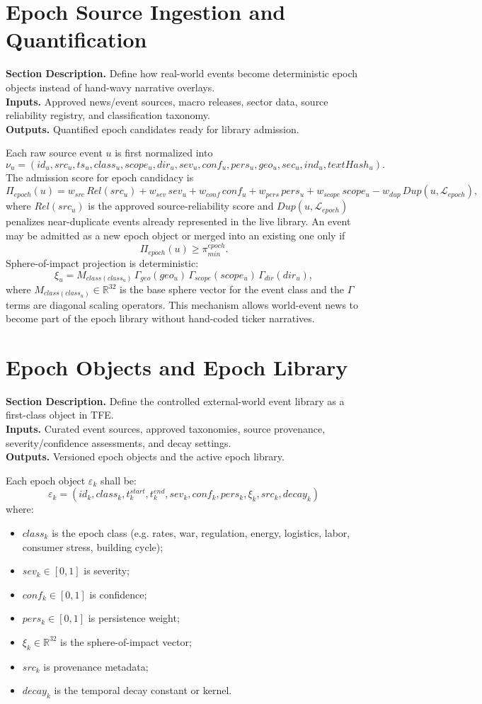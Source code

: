 \documentclass[11pt]{report}
\newcommand{\meta}[3]{\textbf{Section Description.} #1\\
\textbf{Inputs.} #2\\
\textbf{Outputs.} #3\par}
\begin{document}
\section{Epoch Source Ingestion and Quantification}
\meta{Define how real-world events become deterministic epoch objects instead of hand-wavy narrative overlays.}{Approved news/event sources, macro releases, sector data, source reliability registry, and classification taxonomy.}{Quantified epoch candidates ready for library admission.}

Each raw source event $u$ is first normalized into
\[
\nu_u=(id_u,src_u,ts_u,class_u,scope_u,dir_u,sev_u,conf_u,pers_u,geo_u,sec_u,ind_u,textHash_u).
\]
The admission score for epoch candidacy is
\[
\Pi_{epoch}(u)=w_{src}\,Rel(src_u)+w_{sev}\,sev_u+w_{conf}\,conf_u+w_{pers}\,pers_u+w_{scope}\,scope_u-w_{dup}\,Dup(u,\mathcal{L}_{epoch}),
\]
where $Rel(src_u)$ is the approved source-reliability score and $Dup(u,\mathcal{L}_{epoch})$ penalizes near-duplicate events already represented in the live library. An event may be admitted as a new epoch object or merged into an existing one only if
\[
\Pi_{epoch}(u)\ge \pi_{min}^{epoch}.
\]
Sphere-of-impact projection is deterministic:
\[
\xi_u = M_{class(class_u)}\,\Gamma_{geo}(geo_u)\,\Gamma_{scope}(scope_u)\,\Gamma_{dir}(dir_u),
\]
where $M_{class(class_u)}\in\mathbb{R}^{32}$ is the base sphere vector for the event class and the $\Gamma$ terms are diagonal scaling operators. This mechanism allows world-event news to become part of the epoch library without hand-coded ticker narratives.

\section{Epoch Objects and Epoch Library}
\meta{Define the controlled external-world event library as a first-class object in TFE.}{Curated event sources, approved taxonomies, source provenance, severity/confidence assessments, and decay settings.}{Versioned epoch objects and the active epoch library.}

Each epoch object $\varepsilon_k$ shall be:
\[
\varepsilon_k = (id_k,class_k,t_k^{start},t_k^{end},sev_k,conf_k,pers_k,\xi_k,src_k,decay_k)
\]
where:
\begin{itemize}
\item $class_k$ is the epoch class (e.g. rates, war, regulation, energy, logistics, labor, consumer stress, building cycle);
\item $sev_k\in[0,1]$ is severity;
\item $conf_k\in[0,1]$ is confidence;
\item $pers_k\in[0,1]$ is persistence weight;
\item $\xi_k\in\mathbb{R}^{32}$ is the sphere-of-impact vector;
\item $src_k$ is provenance metadata;
\item $decay_k$ is the temporal decay constant or kernel.
\end{itemize}
\end{document}
